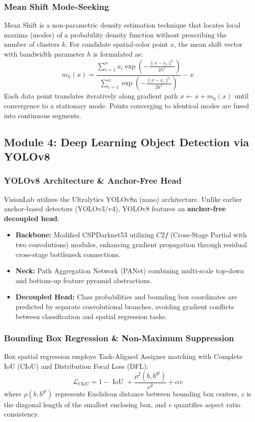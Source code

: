 \subsubsection{Mean Shift Mode-Seeking}
Mean Shift is a non-parametric density estimation technique that locates local maxima (modes) of a probability density function without prescribing the number of clusters $k$. For candidate spatial-color point $x$, the mean shift vector with bandwidth parameter $h$ is formulated as:
\begin{equation}
    m_h(x) = \frac{\sum_{i=1}^n x_i \exp\left( -\frac{\|x - x_i\|^2}{2h^2} \right)}{\sum_{i=1}^n \exp\left( -\frac{\|x - x_i\|^2}{2h^2} \right)} - x
\end{equation}
Each data point translates iteratively along gradient path $x \leftarrow x + m_h(x)$ until convergence to a stationary mode. Points converging to identical modes are fused into continuous segments.

\subsection{Module 4: Deep Learning Object Detection via YOLOv8}

\subsubsection{YOLOv8 Architecture \& Anchor-Free Head}
VisionLab utilizes the Ultralytics YOLOv8n (nano) architecture. Unlike earlier anchor-based detectors (YOLOv3/v4), YOLOv8 features an \textbf{anchor-free decoupled head}:
\begin{itemize}
    \item \textbf{Backbone:} Modified CSPDarknet53 utilizing $C2f$ (Cross-Stage Partial with two convolutions) modules, enhancing gradient propagation through residual cross-stage bottleneck connections.
    \item \textbf{Neck:} Path Aggregation Network (PANet) combining multi-scale top-down and bottom-up feature pyramid abstractions.
    \item \textbf{Decoupled Head:} Class probabilities and bounding box coordinates are predicted by separate convolutional branches, avoiding gradient conflicts between classification and spatial regression tasks.
\end{itemize}

\subsubsection{Bounding Box Regression \& Non-Maximum Suppression}
Box spatial regression employs Task-Aligned Assigner matching with Complete IoU (CIoU) and Distribution Focal Loss (DFL):
\begin{equation}
    \mathcal{L}_{\text{CIoU}} = 1 - \operatorname{IoU} + \frac{\rho^2(b, b^{gt})}{c^2} + \alpha v
\end{equation}
where $\rho(b, b^{gt})$ represents Euclidean distance between bounding box centers, $c$ is the diagonal length of the smallest enclosing box, and $v$ quantifies aspect ratio consistency.

